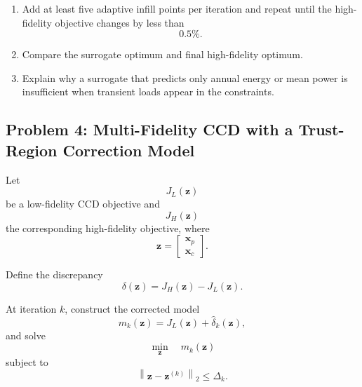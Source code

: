 \begin{enumerate}
    \item Add at least five adaptive infill points per iteration and repeat
    until the high-fidelity objective changes by less than
    \begin{equation}
    0.5\%.
    \end{equation}

    \item Compare the surrogate optimum and final high-fidelity optimum.

    \item Explain why a surrogate that predicts only annual energy or mean
    power is insufficient when transient loads appear in the constraints.
\end{enumerate}


\subsection*{Problem 4: Multi-Fidelity CCD with a Trust-Region Correction Model}

Let
\begin{equation}
J_L(\mathbf{z})
\end{equation}
be a low-fidelity CCD objective and
\begin{equation}
J_H(\mathbf{z})
\end{equation}
the corresponding high-fidelity objective, where
\begin{equation}
\mathbf{z}
=
\begin{bmatrix}
\mathbf{x}_p\\
\mathbf{x}_c
\end{bmatrix}.
\end{equation}

Define the discrepancy
\begin{equation}
\delta(\mathbf{z})
=
J_H(\mathbf{z})-J_L(\mathbf{z}).
\end{equation}

At iteration $k$, construct the corrected model
\begin{equation}
m_k(\mathbf{z})
=
J_L(\mathbf{z})
+
\widehat{\delta}_k(\mathbf{z}),
\end{equation}
and solve
\begin{equation}
\min_{\mathbf{z}}
\quad
m_k(\mathbf{z})
\end{equation}
subject to
\begin{equation}
\left\|
\mathbf{z}-\mathbf{z}^{(k)}
\right\|_2
\leq
\Delta_k.
\end{equation}


